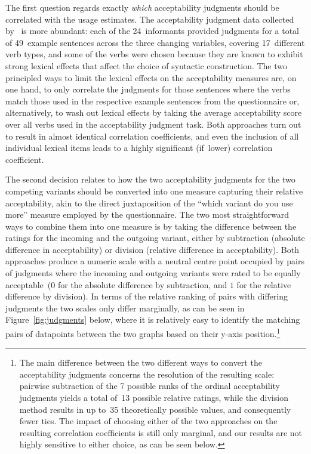 The first question regards exactly \emph{which} acceptability judgments should be correlated with the usage estimates. The acceptability judgment data collected by~\citet{Jamieson2015} is more abundant: each of the 24~informants provided judgments for a total of 49~example sentences across the three changing variables, covering 17~different verb types, and some of the verbs were chosen because they are known to exhibit strong lexical effects that affect the choice of syntactic construction. The two principled ways to limit the lexical effects on the acceptability measures are, on one hand, to only correlate the judgments for those sentences where the verbs match those used in the respective example sentences from the questionnaire or, alternatively, to wash out lexical effects by taking the average acceptability score over all verbs used in the acceptability judgment task. Both approaches turn out to result in almost identical correlation coefficients, and even the inclusion of all individual lexical items leads to a highly significant (if~lower) correlation coefficient.

The second decision relates to how the two acceptability judgments for the two competing variants should be converted into one measure capturing their relative acceptability, akin to the direct juxtaposition of the ``which variant do you use more'' measure employed by the questionnaire. The two most straightforward ways to combine them into one measure is by taking the difference between the ratings for the incoming and the outgoing variant, either by subtraction (absolute difference in acceptability) or division (relative difference in acceptability). %
Both approaches produce a numeric scale with a neutral centre point occupied by pairs of judgments where the incoming and outgoing variants were rated to be equally acceptable~($0$ for the absolute difference by subtraction, and $1$ for the relative difference by division). In terms of the relative ranking of pairs with differing judgments the two scales only differ marginally, as can be seen in Figure~\ref{fig:judgments} below, where it is relatively easy to identify the matching pairs of datapoints between the two graphs based on their y-axis position.\footnote{The main difference between the two different ways to convert the acceptability judgments concerns the resolution of the resulting scale: pairwise subtraction of the 7 possible ranks of the ordinal acceptability judgments yields a total of~13 possible relative ratings, while the division method results in up to~35 theoretically possible values, and consequently fewer ties. The impact of choosing either of the two approaches on the resulting correlation coefficients is still only marginal, and our results are not highly sensitive to either choice, as can be seen below.} %

